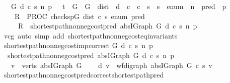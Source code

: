 \begin{isabellebody}
\ \ {\isachardoublequoteopen}{\isasymforall}\ G\ d\ c\ s\ n\ p\ {\isachardot}\ {\isasymGamma}\ {\isasymturnstile}\isactrlsub t\ {\isasymlbrace}\ {\isasymacute}G\ {\isacharequal}\ G\ {\isasymand}\ {\isasymacute}dist\ {\isacharequal}\ d\ {\isasymand}\ {\isasymacute}c\ {\isacharequal}\ c\ {\isasymand}\ {\isasymacute}s\ {\isacharequal}\ s\ {\isasymand}\ {\isasymacute}enum\ {\isacharequal}\ n\ {\isasymand}\ {\isasymacute}pred\ {\isacharequal}\ p\ {\isasymrbrace}\isanewline
\ \ \ \ {\isasymacute}R\ {\isacharcolon}{\isacharequal}{\isacharequal}\ PROC\ check{\isacharunderscore}sp{\isacharparenleft}{\isasymacute}G{\isacharcomma}\ {\isasymacute}dist{\isacharcomma}\ {\isasymacute}c{\isacharcomma}\ {\isasymacute}s{\isacharcomma}\ {\isasymacute}enum{\isacharcomma}\ {\isasymacute}pred{\isacharparenright}\isanewline
\ \ \ \ {\isasymlbrace}\ {\isasymacute}R\ {\isacharequal}\ shortest{\isacharunderscore}path{\isacharunderscore}non{\isacharunderscore}neg{\isacharunderscore}cost{\isacharunderscore}pred\ {\isacharparenleft}abs{\isacharunderscore}IGraph\ G{\isacharparenright}\ d\ c\ s\ n\ p{\isasymrbrace}{\isachardoublequoteclose}\isanewline
%
\isadelimproof
\ \ \ \ %
\endisadelimproof
%
\isatagproof
{}\isamarkupfalse%
\ vcg\ {\isacharparenleft}auto\ simp\ add{\isacharcolon}\ shortest{\isacharunderscore}path{\isacharunderscore}non{\isacharunderscore}neg{\isacharunderscore}cost{\isacharunderscore}eq{\isacharunderscore}invariants{\isacharparenright}%
\endisatagproof
{\isafoldproof}%
%
\isadelimproof
\isanewline
%
\endisadelimproof
\isanewline
{}\isamarkupfalse%
\ shortest{\isacharunderscore}path{\isacharunderscore}non{\isacharunderscore}neg{\isacharunderscore}cost{\isacharunderscore}imp{\isacharunderscore}correct{\isacharcolon}\isanewline
{\isachardoublequoteopen}{\isasymAnd}G\ d\ c\ s\ n\ p\ {\isachardot}\ \isanewline
\ \ shortest{\isacharunderscore}path{\isacharunderscore}non{\isacharunderscore}neg{\isacharunderscore}cost{\isacharunderscore}pred\ {\isacharparenleft}abs{\isacharunderscore}IGraph\ G{\isacharparenright}\ d\ c\ s\ n\ p\ {\isasymlongrightarrow}\isanewline
\ \ \ {\isacharparenleft}{\isasymforall}v\ {\isasymin}\ verts\ {\isacharparenleft}abs{\isacharunderscore}IGraph\ G{\isacharparenright}{\isachardot}\ \isanewline
\ \ \ d\ v\ {\isacharequal}\ wf{\isacharunderscore}digraph{\isachardot}{\isasymmu}\ {\isacharparenleft}abs{\isacharunderscore}IGraph\ G{\isacharparenright}\ c\ s\ v{\isacharparenright}{\isachardoublequoteclose}\isanewline
%
\isadelimproof
%
\endisadelimproof
%
\isatagproof
{}\isamarkupfalse%
\ shortest{\isacharunderscore}path{\isacharunderscore}non{\isacharunderscore}neg{\isacharunderscore}cost{\isacharunderscore}pred{\isachardot}correct{\isacharunderscore}shortest{\isacharunderscore}path{\isacharunderscore}pred\ \isamarkupfalse%

\end{isabellebody}
